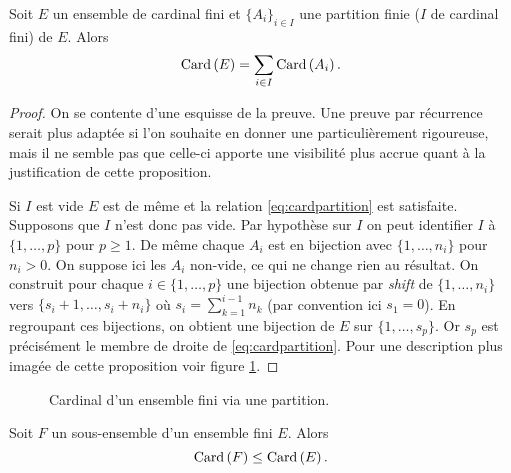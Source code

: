 \documentclass[12pt, a4paper]{article}
\begin{document}
\begin{prop}
  Soit $E$ un ensemble de cardinal fini et $\{A_i\}_{i \in I}$ une
  partition finie ($I$ de cardinal fini) de $E$. Alors
  \begin{equation}
    \label{eq:cardpartition}
    \mathrm{Card}\left(E\right) = \sum_{i \in I} \mathrm{Card}\left(A_i\right).
  \end{equation}
\end{prop}
\begin{proof}
  On se contente d'une esquisse de la preuve. Une preuve par
  récurrence serait plus adaptée si l'on souhaite en donner une
  particulièrement rigoureuse, mais il ne semble pas que celle-ci
  apporte une visibilité plus accrue quant à la justification de cette
  proposition.

  Si $I$ est vide $E$ est de même et la relation
  \ref{eq:cardpartition} est satisfaite. Supposons que $I$ n'est donc
  pas vide. Par hypothèse sur $I$ on peut identifier $I$ à
  $\{1, \ldots, p\}$ pour $p \geq 1$. De même chaque $A_i$ est en
  bijection avec $\{1, \ldots, n_i\}$ pour $n_i > 0$. On suppose ici
  les $A_i$ non-vide, ce qui ne change rien au résultat. On construit
  pour chaque $i \in \{1, \ldots, p\}$ une bijection obtenue par
  \emph{shift} de $\{1, \ldots, n_i\}$ vers
  $\{s_i + 1, \ldots, s_i + n_i\}$ où $s_i = \sum_{k=1}^{i-1} n_k$
  (par convention ici $s_1 = 0$). En regroupant ces bijections, on
  obtient une bijection de $E$ sur $\{1, \ldots, s_p\}$. Or $s_p$ est
  précisément le membre de droite de \ref{eq:cardpartition}. Pour une
  description plus imagée de cette proposition voir
  figure \ref{fig:partition}.
\end{proof}
\begin{figure}
  \centering
  \caption{Cardinal d'un ensemble fini via une partition.}
  \label{fig:partition}
\end{figure}
\begin{cor}
  Soit $F$ un sous-ensemble d'un ensemble fini $E$. Alors
  \[
    \mathrm{Card}\left(F\right) \leq \mathrm{Card}\left(E\right).
  \]
\end{cor}
\end{document}
